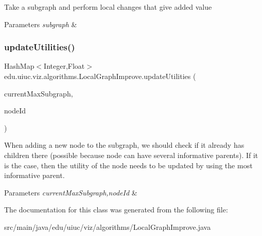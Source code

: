 Take a subgraph and perform local changes that give added value


\begin{DoxyParams}{Parameters}
{\em subgraph} & \\
\hline
\end{DoxyParams}
\mbox{\label{classedu_1_1uiuc_1_1viz_1_1algorithms_1_1_local_graph_improve_a181cac5e84e9f3901eec038297fcd708}} 
\subsubsection{\texorpdfstring{updateUtilities()}{updateUtilities()}}
{\footnotesize\ttfamily Hash\+Map$<$Integer,Float$>$ edu.\+uiuc.\+viz.\+algorithms.\+Local\+Graph\+Improve.\+update\+Utilities (\begin{DoxyParamCaption}\item[{Hash\+Map$<$ Integer, Float $>$}]{current\+Max\+Subgraph,  }\item[{int}]{node\+Id }\end{DoxyParamCaption})}

When adding a new node to the subgraph, we should check if it already has children there (possible because node can have several informative parents). If it is the case, then the utility of the node needs to be updated by using the most informative parent.


\begin{DoxyParams}{Parameters}
{\em current\+Max\+Subgraph,node\+Id} & \\
\hline
\end{DoxyParams}


The documentation for this class was generated from the following file\+:\begin{DoxyCompactItemize}
\item 
src/main/java/edu/uiuc/viz/algorithms/Local\+Graph\+Improve.\+java\end{DoxyCompactItemize}
